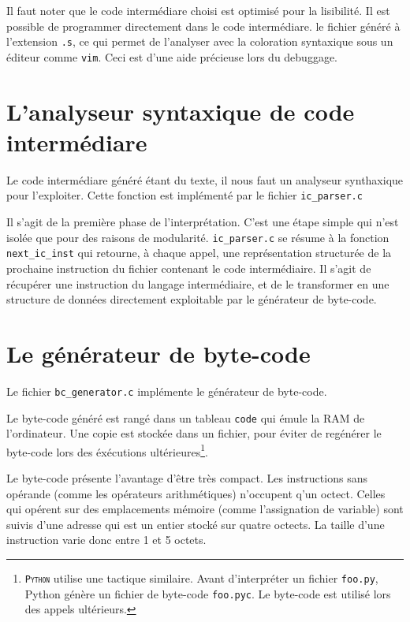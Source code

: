 \documentclass[12pt,a4paper,openright]{report}
\newcommand{\nom}[1]{\textsc{\texttt{#1}}}
\begin{document}
    Il faut noter que le code intermédiare choisi est optimisé pour la
    lisibilité. Il est possible de programmer directement dans le code
    intermédiare. le fichier généré à l'extension \texttt{.s}, ce qui permet de
    l'analyser avec la coloration syntaxique sous un éditeur comme \texttt{vim}.
    Ceci est d'une aide précieuse lors du debuggage.

\chapter{L'analyseur syntaxique de code intermédiare}
    Le code intermédiare généré étant du texte, il nous faut un analyseur
    synthaxique pour l'exploiter. Cette fonction est implémenté par
    le fichier \texttt{ic\_parser.c}

    Il s'agit de la première phase de l'interprétation. C'est une étape
    simple qui n'est isolée que pour des raisons de modularité.
    \texttt{ic\_parser.c} se résume à la fonction
    \texttt{next\_ic\_inst} qui retourne, à chaque appel, une
    représentation structurée de la prochaine instruction du fichier
    contenant le code intermédiaire. Il s'agit de récupérer une instruction du
    langage intermédiaire, et de le transformer en une structure de données
    directement exploitable par le générateur de byte-code.

\chapter{Le générateur de byte-code}
    Le fichier \texttt{bc\_generator.c} implémente le générateur de byte-code.

    Le byte-code généré est rangé dans un tableau \texttt{code} qui
    émule la RAM de l'ordinateur. Une copie est stockée dans un fichier,
    pour éviter de regénérer le byte-code lors des éxécutions
    ultérieures\footnote{\nom{Python} utilise une tactique similaire.
    Avant d'interpréter un fichier \texttt{foo.py}, Python génère un
    fichier de byte-code \texttt{foo.pyc}. Le byte-code est utilisé lors
    des appels ultérieurs.}.

    Le byte-code présente l'avantage d'être très compact. Les instructions
    sans opérande (comme les opérateurs arithmétiques) n'occupent q'un
    octect. Celles qui opérent sur des emplacements mémoire (comme
    l'assignation de variable) sont suivis d'une adresse qui est un
    entier stocké sur quatre octects. La taille d'une instruction varie
    donc entre 1 et 5 octets.
\end{document}
